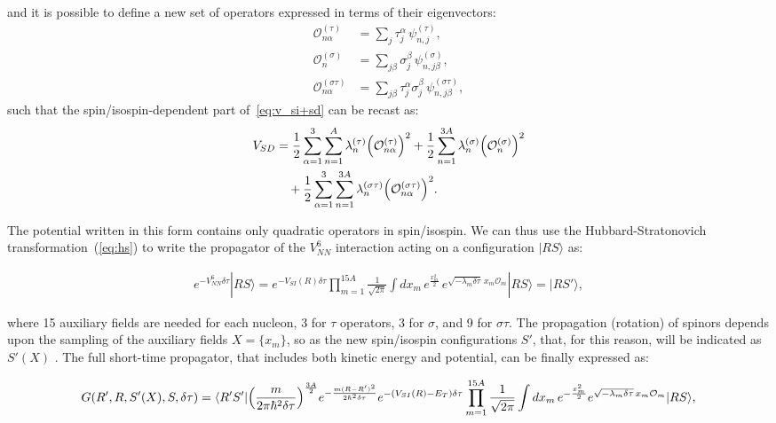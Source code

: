 \documentclass[aps,prc,twocolumn,superscriptaddress,floatfix]{revtex4-1}
\begin{document}
and it is possible to define a new set of operators expressed in terms of their eigenvectors: 
\begin{align}
\mathcal O_{n\alpha}^{(\tau)}&=\sum_{j}\tau_j^\alpha\,\psi_{n,j}^{(\tau)} , \nonumber \\
\mathcal O_{n}^{(\sigma)}&=\sum_{j\beta}\sigma_j^\beta\,\psi_{n,j\beta}^{(\sigma)} , \nonumber \\
\mathcal O_{n\alpha}^{(\sigma\tau)}&=\sum_{j\beta}\tau_j^\alpha\sigma_j^\beta\,\psi_{n,j\beta}^{(\sigma\tau)} ,  
\end{align}
such that the spin/isospin-dependent part of~\cref{eq:v_si+sd} can be recast as:
\begin{align}
V_{SD}&= 
 {1\over2}\sum_{\alpha=1}^3\sum_{n=1}^{A} \lambda_n^{(\tau)}\Big(\mathcal O_{n\alpha}^{(\tau)}\Big)^2
+{1\over2}\sum_{n=1}^{3A} \lambda_n^{(\sigma)}\Big(\mathcal O_n^{(\sigma)}\Big)^2 \nonumber \\
&\quad+{1\over2}\sum_{\alpha=1}^3\sum_{n=1}^{3A} \lambda_n^{(\sigma\tau)}\Big(\mathcal O_{n\alpha}^{(\sigma\tau)}\Big)^2 .
\end{align}

The potential written in this form contains only quadratic operators in spin/isospin. 
We can thus use the Hubbard-Stratonovich transformation~(\ref{eq:hs}) to write the
propagator of the $V_{NN}^6$ interaction acting on a configuration $|RS\rangle$ as:
\begin{widetext}
\begin{align}
e^{-V_{NN}^6\delta\tau}|RS\rangle=e^{-V_{SI}(R)\delta\tau}\prod_{m=1}^{15A}\frac{1}{\sqrt{2\pi}}
\displaystyle\int dx_m\,e^{\frac{x_m^2}{2}}\,e^{\sqrt{-\lambda_m\delta\tau}\,x_m \mathcal O_m}|RS\rangle
=|RS'\rangle ,
\end{align}
\end{widetext}
where 15 auxiliary fields are needed for each nucleon, 3 for $\tau$ operators, 3 for $\sigma$,
and 9 for $\sigma\tau$. The propagation (rotation) of spinors depends upon the sampling
of the auxiliary fields $X=\{x_m\}$, so as the new spin/isospin configurations $S'$, that, for this 
reason, will be indicated as $S'(X)$ .
The full short-time propagator, that includes both kinetic energy and potential, can be 
finally expressed as:
\begin{widetext}
\begin{align}
G(R',R,S'(X),S,\delta\tau)=\langle R'S'|\Big({m\over2\pi\hbar^2\delta\tau}\Big)^{3A\over2}e^{-{m(R-R')^2\over2\hbar^2\delta\tau}}
e^{-(V_{SI}(R)-E_T)\delta\tau}
\prod_{m=1}^{15A}{1\over\sqrt{2\pi}}\int dx_m\,e^{-{x_m^2\over2}}
e^{\sqrt{-\lambda_m\delta\tau}\,x_m \mathcal O_m}|RS\rangle,
\label{eq:prop}
\end{align}
\end{widetext}
\end{document}
